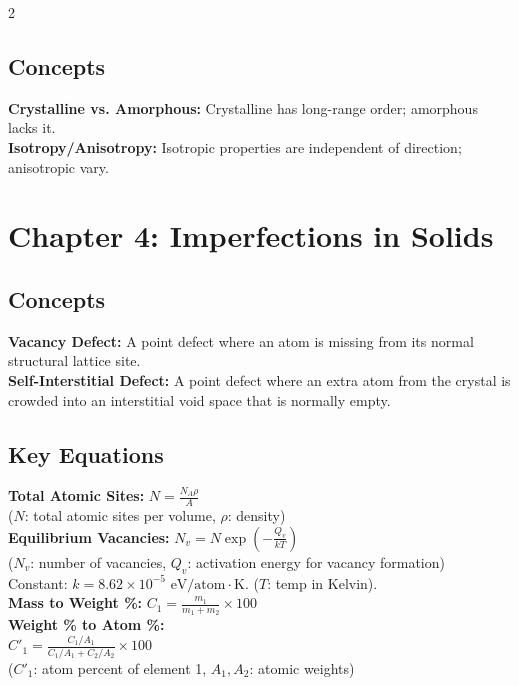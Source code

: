\documentclass[8pt]{article}
\begin{document}
\begin{multicols*}{2}
  \subsection*{Concepts}
  \textbf{Crystalline vs. Amorphous:} Crystalline has long-range order; amorphous lacks it. \\
  \textbf{Isotropy/Anisotropy:} Isotropic properties are independent of direction; anisotropic vary.

  \section*{Chapter 4: Imperfections in Solids}
  \subsection*{Concepts}
  \textbf{Vacancy Defect:} A point defect where an atom is missing from its normal structural lattice site. \\
  \textbf{Self-Interstitial Defect:} A point defect where an extra atom from the crystal is crowded into an interstitial void space that is normally empty.

  \subsection*{Key Equations}
  \textbf{Total Atomic Sites:} \( N = \frac{N_{A} \rho}{A} \) \\
  (\( N \): total atomic sites per volume, \( \rho \): density)\\

  \textbf{Equilibrium Vacancies:} \( N_{v} = N \exp\left(-\frac{Q_{v}}{kT}\right) \) \\
  (\( N_{v} \): number of vacancies, \( Q_{v} \): activation energy for vacancy formation)\\
  Constant: \( k = 8.62 \times 10^{-5} \text{ eV/atom}\cdot\text{K} \). (\( T \): temp in Kelvin). \\

  \textbf{Mass to Weight \%:} \( C_{1} = \frac{m_{1}}{m_{1} + m_{2}} \times 100 \) \\

  \textbf{Weight \% to Atom \%:} \\
  \( C'_{1} = \frac{C_{1} / A_{1}}{C_{1} / A_{1} + C_{2} / A_{2}} \times 100 \) \\
  (\( C'_{1} \): atom percent of element 1, \( A_{1}, A_{2} \): atomic weights) \\


\end{multicols*}
\end{document}
